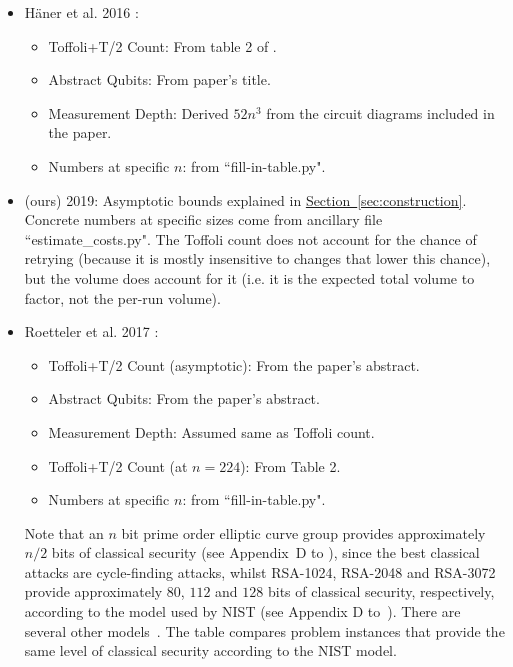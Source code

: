 \documentclass[superscriptaddress,notitlepage,longbibliography]{revtex4-1}
\theoremstyle{definition}
\theoremstyle{definition}
\renewcommand{\sec}[1]{\hyperref[sec:#1]{Section~\ref*{sec:#1}}}
\begin{document}
\begin{itemize}
\begin{itemize}
    \end{itemize}
    \item H\"{a}ner et al. 2016 \cite{haner2016factoring}:
    \begin{itemize}
        \item Toffoli+T/2 Count:
            From table 2 of \cite{roetteler2017quantum}.
        \item Abstract Qubits:
            From paper's title.
        \item Measurement Depth:
            Derived $52n^3$ from the circuit diagrams included in the paper.
        \item Numbers at specific $n$: from ``fill-in-table.py".
    \end{itemize}
    \item (ours) 2019:
        Asymptotic bounds explained in \sec{construction}.
        Concrete numbers at specific sizes come from ancillary file ``estimate\_costs.py".
        The Toffoli count does not account for the chance of retrying (because it is mostly insensitive to changes that lower this chance), but the volume does account for it (i.e. it is the expected total volume to factor, not the per-run volume).
    \item Roetteler et al. 2017 \cite{roetteler2017quantum}:
        \begin{itemize}
            \item Toffoli+T/2 Count (asymptotic):
                From the paper's abstract.
            \item Abstract Qubits:
                From the paper's abstract.
            \item Measurement Depth:
                Assumed same as Toffoli count.
            \item Toffoli+T/2 Count (at $n=224$):
                From Table 2.
            \item Numbers at specific $n$: from ``fill-in-table.py".
        \end{itemize}
        Note that an $n$ bit prime order elliptic curve group provides approximately $n/2$ bits of classical security (see Appendix~D to \cite{nist-sp-800-56-part1-rev3-2018}), since the best classical attacks are cycle-finding attacks,
        whilst RSA-1024, RSA-2048 and RSA-3072 provide approximately $80$, $112$ and $128$ bits of classical security, respectively, according to the model used by NIST (see Appendix D to~\cite{nist-sp-800-56-part2-rev2-2018}).
        There are several other models~\cite{keylength2019, lenstra-model-2004, lenstra-verheul-model-2001}.
        The table compares problem instances that provide the same level of classical security according to the NIST model.
\end{itemize}
\end{document}
